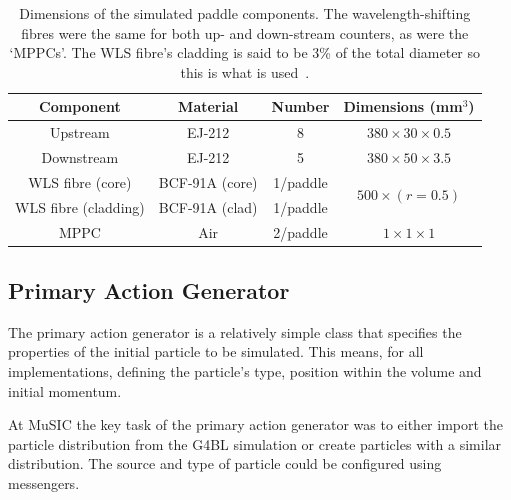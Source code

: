 \begin{table}
  \begin{center}
  \begin{tabular}{c | c | c | c}
    Component      & Material         & Number     &  Dimensions (mm\(^3\)) \\
    \hline
    Upstream              &  EJ-212          &  8         &  \(380\times30\times0.5 \) \\
    Downstream            &  EJ-212          &  5         &  \(380\times50\times3.5 \) \\
    WLS fibre (core)      &  BCF-91A (core)  &  1/paddle  &  
                                        \multirow{2}{*}{\(500\times(r=0.5)\)} \\
    WLS fibre (cladding)  &  BCF-91A (clad)  &  1/paddle  &  \\
    MPPC                  &  Air             &  2/paddle  &  \(1\times1\times1 \) \\
  \end{tabular}
  \end{center}
  \caption{Dimensions of the simulated paddle components. The wavelength-shifting fibres were the same for both up- and down-stream counters, as were the `MPPCs'. The WLS fibre's cladding is said to be 3\% of the total diameter so this is what is used~\cite{bcf_91a}.}
  \label{tab:dimensions_of_paddles}
\end{table}

\subsection{Primary Action Generator} %
\label{sec:primary_action_generator}
The primary action generator is a relatively simple class that specifies the properties of the initial particle to be simulated. This means, for all implementations, defining the particle's type, position within the volume and initial momentum. 

At MuSIC the key task of the primary action generator was to either import the particle distribution from the G4BL simulation or create particles with a similar distribution. The source and type of particle could be configured using messengers.


